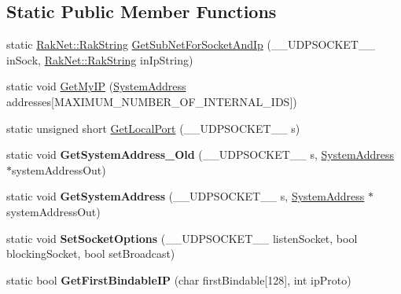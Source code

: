 \subsection*{Static Public Member Functions}
\begin{DoxyCompactItemize}
\item 
static \hyperlink{class_rak_net_1_1_rak_string}{Rak\-Net\-::\-Rak\-String} \hyperlink{class_rak_net_1_1_socket_layer_a0b8b75fb3728bf34003a1110e9056323}{Get\-Sub\-Net\-For\-Socket\-And\-Ip} (\-\_\-\-\_\-\-U\-D\-P\-S\-O\-C\-K\-E\-T\-\_\-\-\_\- in\-Sock, \hyperlink{class_rak_net_1_1_rak_string}{Rak\-Net\-::\-Rak\-String} in\-Ip\-String)
\item 
static void \hyperlink{class_rak_net_1_1_socket_layer_ab0a3c5d72235d0e5f7c5c0bcd1fa9c32}{Get\-My\-I\-P} (\hyperlink{struct_rak_net_1_1_system_address}{System\-Address} addresses\mbox{[}M\-A\-X\-I\-M\-U\-M\-\_\-\-N\-U\-M\-B\-E\-R\-\_\-\-O\-F\-\_\-\-I\-N\-T\-E\-R\-N\-A\-L\-\_\-\-I\-D\-S\mbox{]})
\item 
static unsigned short \hyperlink{class_rak_net_1_1_socket_layer_a1470933b6131c5127f442abdc59df170}{Get\-Local\-Port} (\-\_\-\-\_\-\-U\-D\-P\-S\-O\-C\-K\-E\-T\-\_\-\-\_\- s)
\item 
\hypertarget{class_rak_net_1_1_socket_layer_af717c69524bd78b9d21345a660f79143}{static void {\bfseries Get\-System\-Address\-\_\-\-Old} (\-\_\-\-\_\-\-U\-D\-P\-S\-O\-C\-K\-E\-T\-\_\-\-\_\- s, \hyperlink{struct_rak_net_1_1_system_address}{System\-Address} $\ast$system\-Address\-Out)}\label{class_rak_net_1_1_socket_layer_af717c69524bd78b9d21345a660f79143}

\item 
\hypertarget{class_rak_net_1_1_socket_layer_a89555aaa45d61b7c14819201b8dbc520}{static void {\bfseries Get\-System\-Address} (\-\_\-\-\_\-\-U\-D\-P\-S\-O\-C\-K\-E\-T\-\_\-\-\_\- s, \hyperlink{struct_rak_net_1_1_system_address}{System\-Address} $\ast$system\-Address\-Out)}\label{class_rak_net_1_1_socket_layer_a89555aaa45d61b7c14819201b8dbc520}

\item 
\hypertarget{class_rak_net_1_1_socket_layer_a327844f0901c0c9f2be022cc8d82bb0e}{static void {\bfseries Set\-Socket\-Options} (\-\_\-\-\_\-\-U\-D\-P\-S\-O\-C\-K\-E\-T\-\_\-\-\_\- listen\-Socket, bool blocking\-Socket, bool set\-Broadcast)}\label{class_rak_net_1_1_socket_layer_a327844f0901c0c9f2be022cc8d82bb0e}

\item 
\hypertarget{class_rak_net_1_1_socket_layer_a8b7800c1235c82d331331eb9e0f4b691}{static bool {\bfseries Get\-First\-Bindable\-I\-P} (char first\-Bindable\mbox{[}128\mbox{]}, int ip\-Proto)}\label{class_rak_net_1_1_socket_layer_a8b7800c1235c82d331331eb9e0f4b691}

\end{DoxyCompactItemize}


